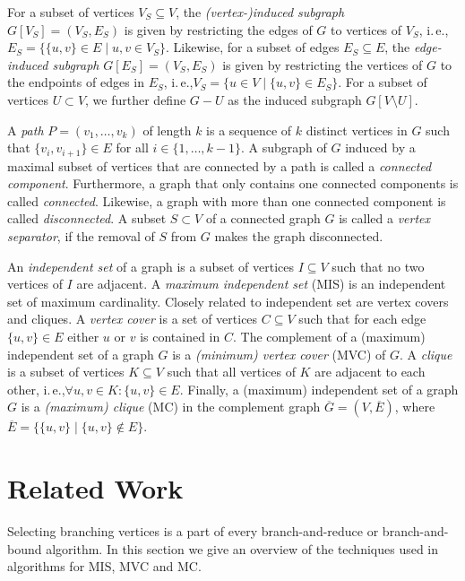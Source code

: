 \documentclass[a4paper,UKenglish,cleveref, autoref, thm-restate]{lipics-v2021}
\newcommand{\ie}{i.\,e.,\xspace}
\begin{document}
For a subset of vertices $V_S \subseteq V$, the \emph{(vertex-)induced subgraph}
$G[V_S] = (V_S, E_S)$ is given by restricting the edges of $G$ to vertices of $V_S$, \ie $E_S = \{\{u,v\} \in E \mid u,v \in V_S\}$.
Likewise, for a subset of edges $E_S \subseteq E$, the \emph{edge-induced
  subgraph} $G[E_S] = (V_S, E_S)$ is given by restricting the vertices of $G$ to the endpoints of edges in $E_S$, \ie $V_S = \{u \in V \mid \{u,v\} \in E_S\}$.
  For a subset of vertices $U \subset V$, we further define $G - U$ as the induced subgraph $G[V \setminus U]$.

A \emph{path} $P=(v_1, \ldots, v_k)$ of length $k$ is a sequence of $k$ distinct vertices in $G$ such that $\{v_i, v_{i+1}\} \in E$ for all $i \in \{1, \ldots, k-1\}$.
A subgraph of $G$ induced by a maximal subset of vertices that are connected by a path is called a \emph{connected component}.
Furthermore, a graph that only contains one connected components is called \emph{connected}.
Likewise, a graph with more than one connected component is called \emph{disconnected}.
A subset $S \subset V$ of a connected graph $G$ is called a \emph{vertex separator}, if the removal of $S$ from $G$ makes the graph disconnected.

An \emph{independent set} of a graph is a subset of vertices $I \subseteq V$ such that no two vertices of $I$ are adjacent. 
A \emph{maximum independent set} (MIS) is an independent set of maximum cardinality.
Closely related to independent set are vertex covers and cliques.
A \emph{vertex cover} is a set of vertices $C \subseteq V$ such that for each edge $\{u,v\} \in E$ either $u$ or $v$ is contained in $C$.
The complement of a (maximum) independent set of a graph $G$ is a \emph{(minimum) vertex cover} (MVC) of $G$.
A \emph{clique} is a subset of vertices $K \subseteq V$ such that all vertices of $K$ are adjacent to each other, \ie $\forall u,v \in K: \{u,v\} \in E$.
Finally, a (maximum) independent set of a graph $G$ is a \emph{(maximum) clique} (MC) in the complement graph $\overline{G} = (V, \overline{E})$, where $\overline{E} = \{\{u,v\} \mid \{u,v\} \not\in E\}$.

\section{Related Work}
Selecting branching vertices is a part of every branch-and-reduce or
branch-and-bound algorithm. In this section we give an overview of the techniques used in
algorithms for MIS, MVC and MC.
\end{document}

